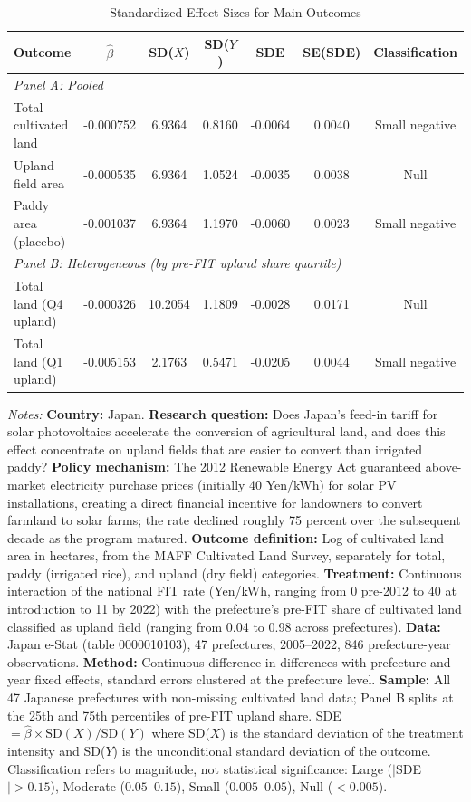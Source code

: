 \begin{table}[H]
\centering
\caption{Standardized Effect Sizes for Main Outcomes}
\label{tab:sde}
\begin{threeparttable}
\small
\begin{tabular}{lcccccc}
\toprule
Outcome & $\hat{\beta}$ & SD($X$) & SD($Y$) & SDE & SE(SDE) & Classification \\
\midrule
\multicolumn{7}{l}{\textit{Panel A: Pooled}} \\
Total cultivated land & -0.000752 & 6.9364 & 0.8160 & -0.0064 & 0.0040 & Small negative \\
Upland field area & -0.000535 & 6.9364 & 1.0524 & -0.0035 & 0.0038 & Null \\
Paddy area (placebo) & -0.001037 & 6.9364 & 1.1970 & -0.0060 & 0.0023 & Small negative \\
\midrule
\multicolumn{7}{l}{\textit{Panel B: Heterogeneous (by pre-FIT upland share quartile)}} \\
Total land (Q4 upland) & -0.000326 & 10.2054 & 1.1809 & -0.0028 & 0.0171 & Null \\
Total land (Q1 upland) & -0.005153 & 2.1763 & 0.5471 & -0.0205 & 0.0044 & Small negative \\
\bottomrule
\end{tabular}
\begin{tablenotes}[flushleft]
\footnotesize\sloppy
\item \textit{Notes:} \textbf{Country:} Japan. \textbf{Research question:} Does Japan's feed-in tariff for solar photovoltaics accelerate the conversion of agricultural land, and does this effect concentrate on upland fields that are easier to convert than irrigated paddy? \textbf{Policy mechanism:} The 2012 Renewable Energy Act guaranteed above-market electricity purchase prices (initially 40 Yen/kWh) for solar PV installations, creating a direct financial incentive for landowners to convert farmland to solar farms; the rate declined roughly 75 percent over the subsequent decade as the program matured. \textbf{Outcome definition:} Log of cultivated land area in hectares, from the MAFF Cultivated Land Survey, separately for total, paddy (irrigated rice), and upland (dry field) categories. \textbf{Treatment:} Continuous interaction of the national FIT rate (Yen/kWh, ranging from 0 pre-2012 to 40 at introduction to 11 by 2022) with the prefecture's pre-FIT share of cultivated land classified as upland field (ranging from 0.04 to 0.98 across prefectures). \textbf{Data:} Japan e-Stat (table 0000010103), 47 prefectures, 2005--2022, 846 prefecture-year observations. \textbf{Method:} Continuous difference-in-differences with prefecture and year fixed effects, standard errors clustered at the prefecture level. \textbf{Sample:} All 47 Japanese prefectures with non-missing cultivated land data; Panel B splits at the 25th and 75th percentiles of pre-FIT upland share. SDE $= \hat{\beta} \times \text{SD}(X) / \text{SD}(Y)$ where SD($X$) is the standard deviation of the treatment intensity and SD($Y$) is the unconditional standard deviation of the outcome. Classification refers to magnitude, not statistical significance: Large ($|$SDE$| > 0.15$), Moderate ($0.05$--$0.15$), Small ($0.005$--$0.05$), Null ($< 0.005$).

\end{tablenotes}
\end{threeparttable}
\end{table}

